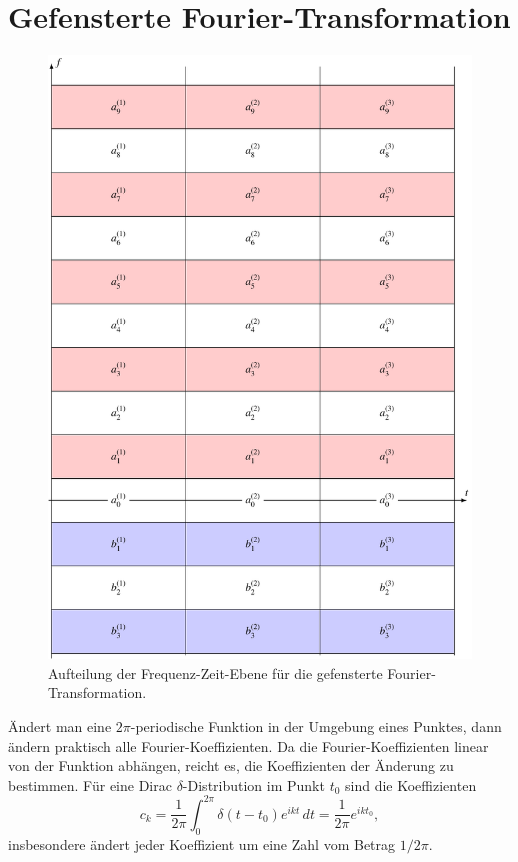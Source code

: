 %
%
%
\section{Gefensterte Fourier-Transformation
\label{section:gefenstert}}
\begin{figure}
\centering
\includegraphics{chapters/2-fourier/images/wft.pdf}
\caption{Aufteilung der Frequenz-Zeit-Ebene für die gefensterte
Fourier-Transformation.
\label{wft:ftplane}}
\end{figure}
Ändert man eine $2\pi$-periodische Funktion in der Umgebung eines Punktes,
dann ändern praktisch alle Fourier-Koeffizienten.
Da die Fourier-Koeffizienten linear von der Funktion abhängen,
reicht es, die Koeffizienten der Änderung zu bestimmen.
Für eine Dirac $\delta$-Distribution im Punkt $t_0$ sind die Koeffizienten
\[
c_k
=
\frac{1}{2\pi} \int_0^{2\pi} \delta(t-t_0) e^{ikt}\,dt
=
\frac{1}{2\pi} e^{ikt_0},
\]
insbesondere ändert jeder Koeffizient um eine Zahl vom Betrag $1/2\pi$.

